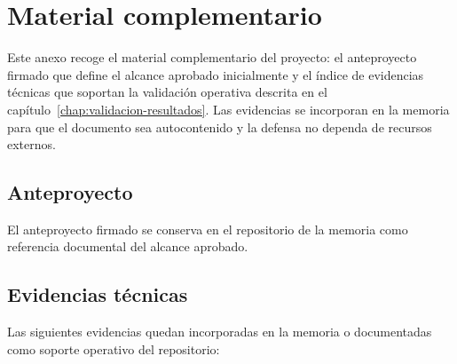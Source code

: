 \chapter{Material complementario}
\label{chap:adicional}

Este anexo recoge el material complementario del proyecto: el anteproyecto firmado que define el alcance aprobado inicialmente y el índice de evidencias técnicas que soportan la validación operativa descrita en el capítulo~\ref{chap:validacion-resultados}. Las evidencias se incorporan en la memoria para que el documento sea autocontenido y la defensa no dependa de recursos externos.

\section{Anteproyecto}
\label{sec:anexo-anteproyecto}

El anteproyecto firmado se conserva en el repositorio de la memoria como referencia documental del alcance aprobado.

\section{Evidencias técnicas}
\label{sec:anexo-evidencias}

Las siguientes evidencias quedan incorporadas en la memoria o documentadas como soporte operativo del repositorio:

